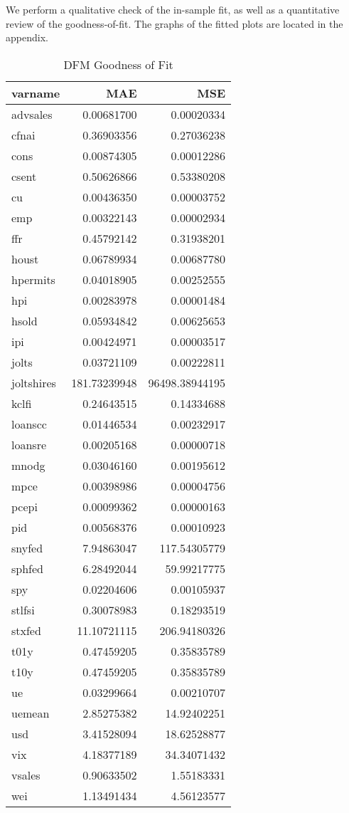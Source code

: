 \documentclass[11pt, letterpaper]{article}\usepackage[]{graphicx}\usepackage[]{color}
\begin{document}
We perform a qualitative check of the in-sample fit, as well as a quantitative review of the goodness-of-fit. The graphs of the fitted plots are located in the appendix.
\begin{table}[H]
\centering
\begingroup\footnotesize
\begin{tabular}{lrr}
  \hline
varname & MAE & MSE \\ 
  \hline
advsales & 0.00681700 & 0.00020334 \\ 
  cfnai & 0.36903356 & 0.27036238 \\ 
  cons & 0.00874305 & 0.00012286 \\ 
  csent & 0.50626866 & 0.53380208 \\ 
  cu & 0.00436350 & 0.00003752 \\ 
  emp & 0.00322143 & 0.00002934 \\ 
  ffr & 0.45792142 & 0.31938201 \\ 
  houst & 0.06789934 & 0.00687780 \\ 
  hpermits & 0.04018905 & 0.00252555 \\ 
  hpi & 0.00283978 & 0.00001484 \\ 
  hsold & 0.05934842 & 0.00625653 \\ 
  ipi & 0.00424971 & 0.00003517 \\ 
  jolts & 0.03721109 & 0.00222811 \\ 
  joltshires & 181.73239948 & 96498.38944195 \\ 
  kclfi & 0.24643515 & 0.14334688 \\ 
  loanscc & 0.01446534 & 0.00232917 \\ 
  loansre & 0.00205168 & 0.00000718 \\ 
  mnodg & 0.03046160 & 0.00195612 \\ 
  mpce & 0.00398986 & 0.00004756 \\ 
  pcepi & 0.00099362 & 0.00000163 \\ 
  pid & 0.00568376 & 0.00010923 \\ 
  snyfed & 7.94863047 & 117.54305779 \\ 
  sphfed & 6.28492044 & 59.99217775 \\ 
  spy & 0.02204606 & 0.00105937 \\ 
  stlfsi & 0.30078983 & 0.18293519 \\ 
  stxfed & 11.10721115 & 206.94180326 \\ 
  t01y & 0.47459205 & 0.35835789 \\ 
  t10y & 0.47459205 & 0.35835789 \\ 
  ue & 0.03299664 & 0.00210707 \\ 
  uemean & 2.85275382 & 14.92402251 \\ 
  usd & 3.41528094 & 18.62528877 \\ 
  vix & 4.18377189 & 34.34071432 \\ 
  vsales & 0.90633502 & 1.55183331 \\ 
  wei & 1.13491434 & 4.56123577 \\ 
   \hline
\end{tabular}
\endgroup
\caption{DFM Goodness of Fit} 
\end{table}
\end{document}
